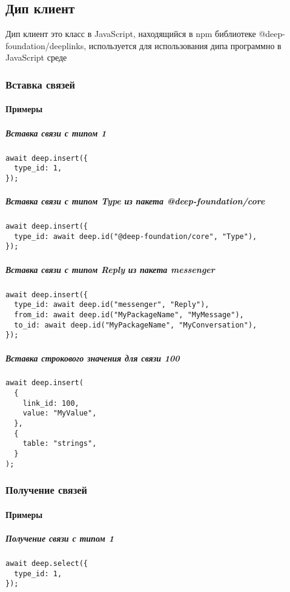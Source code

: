 \documentclass{article}
\begin{document}
\subsection{Дип клиент}
Дип клиент это класс в JavaScript, находящийся в npm библиотеке
@deep-foundation/deeplinks, используется для использования дипа
программно в JavaScript среде

\subsubsection{Вставка связей}

\paragraph{Примеры}

\subparagraph{Вставка связи с типом 1}
\begin{lstlisting}
await deep.insert({
  type_id: 1,
});
\end{lstlisting}

\subparagraph{Вставка связи с типом Type из пакета @deep-foundation/core}
\begin{lstlisting}
await deep.insert({
  type_id: await deep.id("@deep-foundation/core", "Type"),
});
\end{lstlisting}

\subparagraph{Вставка связи с типом Reply из пакета messenger}
\begin{lstlisting}
await deep.insert({
  type_id: await deep.id("messenger", "Reply"),
  from_id: await deep.id("MyPackageName", "MyMessage"),
  to_id: await deep.id("MyPackageName", "MyConversation"),
});
\end{lstlisting}

\subparagraph{Вставка строкового значения для связи 100}
\begin{lstlisting}
await deep.insert(
  {
    link_id: 100,
    value: "MyValue",
  },
  {
    table: "strings",
  }
);
\end{lstlisting}

\subsubsection{Получение связей}

\paragraph{Примеры}

\subparagraph{Получение связи с типом 1}
\begin{lstlisting}
await deep.select({
  type_id: 1,
});
\end{lstlisting}
\end{document}
